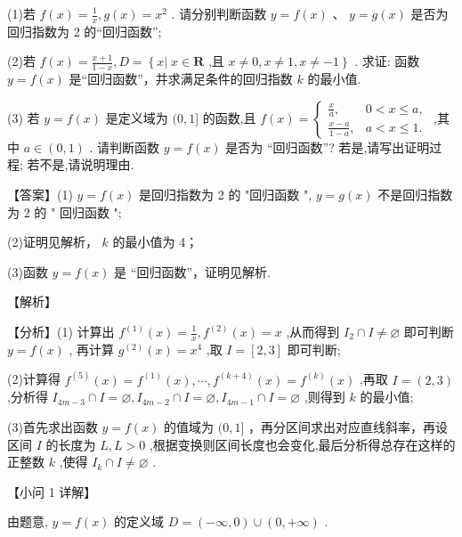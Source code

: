 \documentclass[10pt]{article}
\begin{document}
(1)若 \(f\left( x\right)  = \frac{1}{x},g\left( x\right)  = {x}^{2}\) . 请分别判断函数 \(y = f\left( x\right) \text{ 、 }y = g\left( x\right)\) 是否为回归指数为 2 的“回归函数”;

(2)若 \(f\left( x\right)  = \frac{x + 1}{1 - x},D = \left\{  {x\left| {\;x \in  \mathbf{R}}\right. \text{ ,且 }x \neq  0,x \neq  1,x \neq   - 1}\right\}\) . 求证: 函数 \(y = f\left( x\right)\) 是“回归函数”，并求满足条件的回归指数 \(k\) 的最小值.

(3) 若 \(y = f\left( x\right)\) 是定义域为 \((0,1\rbrack\) 的函数,且 \(f\left( x\right)  = \left\{  \begin{array}{ll} \frac{x}{a}, & 0 < x \leq  a, \\  \frac{x - a}{1 - a}, & a < x \leq  1. \end{array}\right.\) ,其中 \(a \in  \left( {0,1}\right)\) . 请判断函数 \(y = f\left( x\right)\) 是否为 “回归函数”? 若是,请写出证明过程; 若不是,请说明理由.

【答案】(1) \(y = f\left( x\right)\) 是回归指数为 2 的 "回归函数 ", \(y = g\left( x\right)\) 不是回归指数为 2 的 " 回归函数 ";

(2)证明见解析， \(k\) 的最小值为 4；

(3)函数 \(y = f\left( x\right)\) 是 “回归函数”，证明见解析.

【解析】

【分析】(1) 计算出 \({f}^{\left( 1\right) }\left( x\right)  = \frac{1}{x},{f}^{\left( 2\right) }\left( x\right)  = x\) ,从而得到 \({I}_{2} \cap  I \neq  \varnothing\) 即可判断 \(y = f\left( x\right)\) , 再计算 \({g}^{\left( 2\right) }\left( x\right)  = {x}^{4}\) ,取 \(I = \left\lbrack  {2,3}\right\rbrack\) 即可判断;

(2)计算得 \({f}^{\left( 5\right) }\left( x\right)  = {f}^{\left( 1\right) }\left( x\right) ,\cdots ,{f}^{\left( k + 4\right) }\left( x\right)  = {f}^{\left( k\right) }\left( x\right)\) ,再取 \(I = \left( {2,3}\right)\) ,分析得 \({I}_{{4m} - 3} \cap  I = \varnothing ,{I}_{{4m} - 2} \cap  I = \varnothing ,{I}_{{4m} - 1} \cap  I = \varnothing\) ,则得到 \(k\) 的最小值;

(3)首先求出函数 \(y = f\left( x\right)\) 的值域为 \((0,1\rbrack\) ，再分区间求出对应直线斜率，再设区间 \(I\) 的长度为 \(L,L > 0\) ,根据变换则区间长度也会变化,最后分析得总存在这样的正整数 \(k\) ,使得 \({I}_{k} \cap  I \neq  \varnothing\) .

【小问 1 详解】

由题意, \(y = f\left( x\right)\) 的定义域 \(D = \left( {-\infty ,0}\right)  \cup  \left( {0, + \infty }\right)\) .
\end{document}
